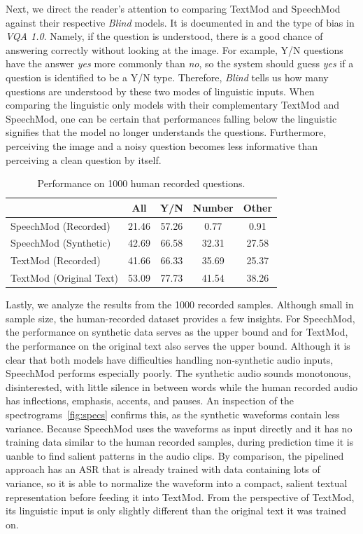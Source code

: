 \documentclass[letterpaper]{article} %
\begin{document}
Next, we direct the reader's attention to comparing TextMod and SpeechMod against their respective \textit{Blind} models. It is documented in  and  the type of bias in \textit{VQA 1.0}. Namely, if the question is understood, there is a good chance of answering correctly without looking at the image. For example, Y/N questions have the answer \emph{yes} more commonly than \emph{no}, so the system should guess \emph{yes} if a question is identified to be a Y/N type. Therefore, \textit{Blind} tells us how many questions are understood by these two modes of linguistic inputs. When comparing the linguistic only models with their complementary TextMod and SpeechMod, one can be certain that performances falling below the linguistic signifies that the model no longer understands the questions. Furthermore, perceiving the image and a noisy question becomes less informative than perceiving a clean question by itself.

\begin{table}[t]
\centering
\caption{Performance on 1000 human recorded questions.}
\label{table:recorded}
\begin{tabular}{l|cccc}
                        & All   & Y/N   & Number & Other \\ \hline
SpeechMod (Recorded)    & 21.46 & 57.26 & 0.77   & 0.91  \\
SpeechMod (Synthetic)   & 42.69 & 66.58 & 32.31  & 27.58 \\ \hline
TextMod (Recorded)      & 41.66 & 66.33 & 35.69  & 25.37 \\
TextMod (Original Text) & 53.09 & 77.73 & 41.54  & 38.26
\end{tabular}
\end{table}

Lastly, we analyze the results from the 1000 recorded samples. Although small in sample size, the human-recorded dataset provides a few insights. For SpeechMod, the performance on synthetic data serves as the upper bound and for TextMod, the performance on the original text also serves the upper bound. Although it is clear that both models have difficulties handling non-synthetic audio inputs, SpeechMod performs especially poorly. The synthetic audio sounds monotonous, disinterested, with little silence in between words while the human recorded audio has inflections, emphasis, accents, and pauses. An inspection of the spectrograms~\ref{fig:specs} confirms this, as the synthetic waveforms contain less variance. Because SpeechMod uses the waveforms as input directly and it has no training data similar to the human recorded samples, during prediction time it is uanble to find salient patterns in the audio clips. By comparison, the pipelined approach has an ASR that is already trained with data containing lots of variance, so it is able to normalize the waveform into a compact, salient textual representation before feeding it into TextMod. From the perspective of TextMod, its linguistic input is only slightly different than the original text it was trained on.
\end{document}

